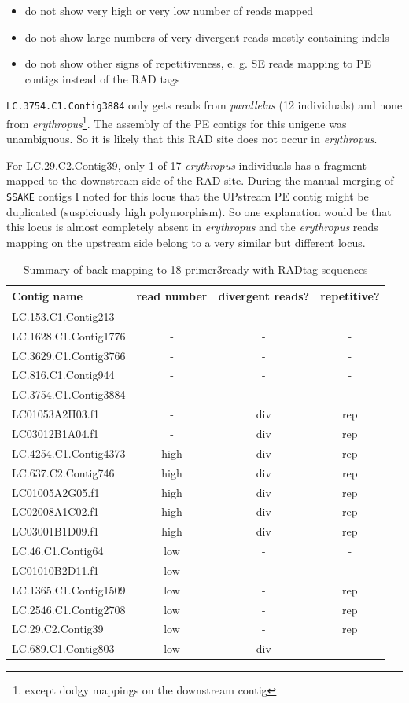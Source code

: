 \documentclass{article}\usepackage[]{graphicx}\usepackage[]{color}
\begin{document}
\begin{itemize}
\item do not show very high or very low number of reads mapped
\item do not show large numbers of very divergent reads mostly containing indels
\item do not show other signs of repetitiveness, e. g. SE reads mapping to PE contigs instead of the RAD tags
\end{itemize}

\texttt{LC.3754.C1.Contig3884} only gets reads from \textit{parallelus} (12 individuals) and none from \textit{erythropus}\footnote{except dodgy mappings on the downstream contig}. The assembly of the PE contigs for this unigene was unambiguous. So it is likely that this RAD site does not occur in \textit{erythropus}.


For {\color{red}LC.29.C2.Contig39}, only 1 of 17 \textit{erythropus} individuals has a fragment mapped to the downstream side of the RAD site. During the manual merging of \texttt{SSAKE} contigs I noted for this locus that the UPstream PE contig might be duplicated (suspiciously high polymorphism). So one explanation would be that this locus is almost completely absent in \textit{erythropus} and the \textit{erythropus} reads mapping on the upstream side belong to a very similar but different locus.
  
\begin{table}
\centering
\caption{Summary of back mapping to 18 primer3ready with RADtag sequences}
\label{back-mapping-summary}
\begin{tabular}{lccc}
\toprule
Contig name & read number & divergent reads? & repetitive?\\
\midrule
LC.153.C1.Contig213 & - & - & - \\
LC.1628.C1.Contig1776 & - & - & - \\
LC.3629.C1.Contig3766 & - & - & - \\
LC.816.C1.Contig944 & - & - & - \\
LC.3754.C1.Contig3884 & - & - & - \\
LC01053A2H03.f1 & - & div & rep \\
LC03012B1A04.f1 & - & div & rep \\
LC.4254.C1.Contig4373 & high & div & rep \\
LC.637.C2.Contig746 & high & div & rep \\
LC01005A2G05.f1 & high & div & rep \\
LC02008A1C02.f1 & high & div & rep \\
LC03001B1D09.f1 & high & div & rep \\
LC.46.C1.Contig64 & low & - & - \\
LC01010B2D11.f1 & low & - & - \\
LC.1365.C1.Contig1509 & low & - & rep \\
LC.2546.C1.Contig2708 & low & - & rep \\
LC.29.C2.Contig39 & low & - & rep \\
LC.689.C1.Contig803 & low & div & - \\
\bottomrule
\end{tabular}
\end{table}
\end{document}
